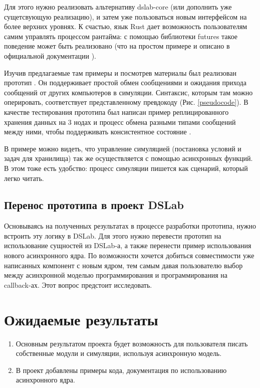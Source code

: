 Для этого нужно реализовать альтернативу dslab-core (или дополнить уже сущетсвующую реализацию), и затем уже пользоваться новым интерфейсом на более верхних уровнях. К счастью, язык Rust дает возможность пользователям самим управлять процессом рантайма: с помощью библиотеки futures \cite{rust-futures} такое поведение может быть реализовано (что на простом примере и описано в официальной документации \cite{async-book}).

Изучив предлагаемые там примеры и посмотрев материалы был реализован прототип \cite{my-demo}. Он поддерживает простой обмен сообщениями и ожидания прихода сообщений от других компьютеров в симуляции. Синтаксис, которым там можно оперировать, соответствует представленному превдокоду (Рис. \ref{pseudocode}). В качестве тестирования прототипа был написан пример реплицированного хранения данных на 3 нодах и процесс обмена разными типами сообщений между ними, чтобы поддерживать консистентное состояние \cite{my-demo-replicas}. 

В примере можно видеть, что управление симуляцией (постановка условий и задач для хранилища) так же осуществляется с помощью асинхронных функций. В этом тоже есть удобство: процесс симуляции пишется как сценарий, который легко читать. 

\subsection{Перенос прототипа в проект DSLab}

Основываясь на полученных результатах в процессе разработки прототипа, нужно встроить эту логику в DSLab. Для этого нужно перевести прототип на использование сущностей из DSLab-а, а также перенести пример использования нового асинхронного ядра. По возможности хочется добиться совместимости уже написанных компонент с новым ядром, тем самым давая пользователю выбор между асинхронной моделью программирования и программирования на callback-ах. Этот вопрос предстоит исследовать. 

\section{Ожидаемые результаты}

\begin{enumerate}
    \item 
    Основным результатом проекта будет возможность для пользователя писать собственные модули и симуляции, используя асинхронную модель. 
    \item В проект добавлены примеры кода, документация по использованию асинхронного ядра.
\end{enumerate}
    
